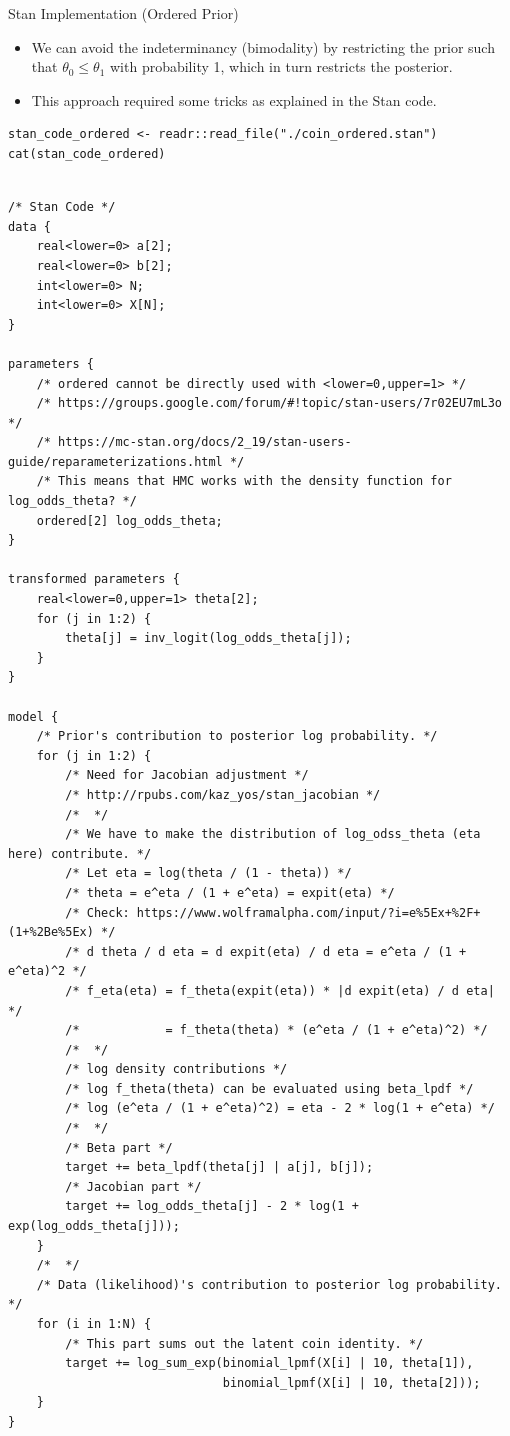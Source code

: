 \documentclass[dvipdfmx,bigger,aspectratio=169]{beamer}
\begin{document}
\begin{frame}[fragile,allowframebreaks,label=,t]{Stan Implementation (Ordered Prior)}
 \begin{itemize}
\item We can avoid the indeterminancy (bimodality) by restricting the prior such that \(\theta_{0} \le \theta_{1}\) with probability 1, which in turn restricts the posterior.
\item This approach required some tricks as explained in the Stan code.
\end{itemize}
\scriptsize
\begin{verbatim}
stan_code_ordered <- readr::read_file("./coin_ordered.stan")
cat(stan_code_ordered)
\end{verbatim}

\begin{verbatim}

/* Stan Code */
data {
    real<lower=0> a[2];
    real<lower=0> b[2];
    int<lower=0> N;
    int<lower=0> X[N];
}

parameters {
    /* ordered cannot be directly used with <lower=0,upper=1> */
    /* https://groups.google.com/forum/#!topic/stan-users/7r02EU7mL3o */
    /* https://mc-stan.org/docs/2_19/stan-users-guide/reparameterizations.html */
    /* This means that HMC works with the density function for log_odds_theta? */
    ordered[2] log_odds_theta;
}

transformed parameters {
    real<lower=0,upper=1> theta[2];
    for (j in 1:2) {
        theta[j] = inv_logit(log_odds_theta[j]);
    }
}

model {
    /* Prior's contribution to posterior log probability. */
    for (j in 1:2) {
        /* Need for Jacobian adjustment */
        /* http://rpubs.com/kaz_yos/stan_jacobian */
        /*  */
        /* We have to make the distribution of log_odss_theta (eta here) contribute. */
        /* Let eta = log(theta / (1 - theta)) */
        /* theta = e^eta / (1 + e^eta) = expit(eta) */
        /* Check: https://www.wolframalpha.com/input/?i=e%5Ex+%2F+(1+%2Be%5Ex) */
        /* d theta / d eta = d expit(eta) / d eta = e^eta / (1 + e^eta)^2 */
        /* f_eta(eta) = f_theta(expit(eta)) * |d expit(eta) / d eta| */
        /*            = f_theta(theta) * (e^eta / (1 + e^eta)^2) */
        /*  */
        /* log density contributions */
        /* log f_theta(theta) can be evaluated using beta_lpdf */
        /* log (e^eta / (1 + e^eta)^2) = eta - 2 * log(1 + e^eta) */
        /*  */
        /* Beta part */
        target += beta_lpdf(theta[j] | a[j], b[j]);
        /* Jacobian part */
        target += log_odds_theta[j] - 2 * log(1 + exp(log_odds_theta[j]));
    }
    /*  */
    /* Data (likelihood)'s contribution to posterior log probability. */
    for (i in 1:N) {
        /* This part sums out the latent coin identity. */
        target += log_sum_exp(binomial_lpmf(X[i] | 10, theta[1]),
                              binomial_lpmf(X[i] | 10, theta[2]));
    }
}
\end{verbatim}


\end{frame}
\end{document}

